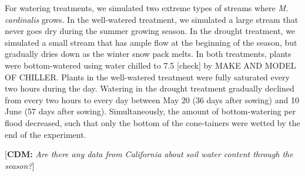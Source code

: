 \documentclass[11pt, oneside]{article}\usepackage[]{graphicx}\usepackage[]{color}
\newcommand{\cdm}[1]{{ \color{magenta} [{\bf{CDM:}} {\em#1}]}} %
\begin{document}
For watering treatments, we simulated two extreme types of streams where \textit{M. cardinalis} grows. In the well-watered treatment, we simulated a large stream that never goes dry during the summer growing season. In the drought treatment, we simulated a small stream that has ample flow at the beginning of the season, but gradually dries down as the winter snow pack melts. In both treatments, plants were bottom-watered using  water chilled to 7.5 [check] by MAKE AND MODEL OF CHILLER. Plants in the well-watered treatment were fully saturated every two hours during the day. Watering in the drought treatment gradually declined from every two hours to every day between May 20 (36 days after sowing) and 10 June (57 days after sowing). Simultaneously, the amount of bottom-watering per flood decreased, such that only the bottom of the cone-tainers were wetted by the end of the experiment.

\cdm{Are there any data from California about soil water content through the season?}
\end{document}
